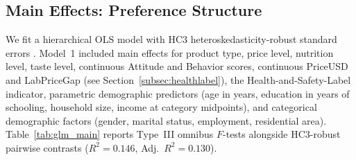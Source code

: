 \subsection{Main Effects: Preference Structure}\label{subsec:main-effects}

We fit a hierarchical OLS model with HC3 heteroskedasticity-robust standard errors \citep{mackinnon1985}. Model~1 included main effects for product type, price level, nutrition level, taste level, continuous Attitude and Behavior scores, continuous PriceUSD and LabPriceGap (see Section~\ref{subsec:healthlabel}), the Health-and-Safety-Label indicator, parametric demographic predictors (age in years, education in years of schooling, household size, income at category midpoints), and categorical demographic factors (gender, marital status, employment, residential area). Table~\ref{tab:glm_main} reports Type~III omnibus $F$-tests alongside HC3-robust pairwise contrasts ($R^2=0.146$, Adj.\ $R^2=0.130$).

